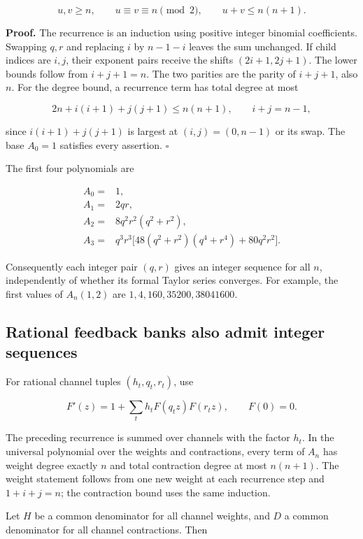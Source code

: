 \[
u,v\ge n,\qquad u\equiv v\equiv n\pmod2,\qquad u+v\le n(n+1).
\]

\textbf{Proof.} The recurrence is an induction using positive integer
binomial coefficients. Swapping \(q,r\) and replacing \(i\) by \(n-1-i\)
leaves the sum unchanged. If child indices are \(i,j\), their exponent
pairs receive the shifts \((2i+1,2j+1)\). The lower bounds follow from
\(i+j+1=n\). The two parities are the parity of \(i+j+1\), also \(n\).
For the degree bound, a recurrence term has total degree at most

\[
2n+i(i+1)+j(j+1)\le n(n+1),\qquad i+j=n-1,
\]

since \(i(i+1)+j(j+1)\) is largest at \((i,j)=(0,n-1)\) or its swap. The
base \(A_0=1\) satisfies every assertion. \(\square\)

The first four polynomials are

\[
\begin{aligned}
A_0={}&1,\\
A_1={}&2qr,\\
A_2={}&8q^2r^2(q^2+r^2),\\
A_3={}&q^3r^3\bigl[48(q^2+r^2)(q^4+r^4)+80q^2r^2\bigr].
\end{aligned}
\]

Consequently each integer pair \((q,r)\) gives an integer sequence for
all \(n\), independently of whether its formal Taylor series converges.
For example, the first values of \(A_n(1,2)\) are
\(1,4,160,35200,38041600\).

\hypertarget{rational-feedback-banks-also-admit-integer-sequences}{%
\subsection{Rational feedback banks also admit integer
sequences}\label{rational-feedback-banks-also-admit-integer-sequences}}

For rational channel tuples \((h_t,q_t,r_t)\), use

\[
F'(z)=1+\sum_t h_tF(q_tz)F(r_tz),\qquad F(0)=0.
\]

The preceding recurrence is summed over channels with the factor
\(h_t\). In the universal polynomial over the weights and contractions,
every term of \(A_n\) has weight degree exactly \(n\) and total
contraction degree at most \(n(n+1)\). The weight statement follows from
one new weight at each recurrence step and \(1+i+j=n\); the contraction
bound uses the same induction.

Let \(H\) be a common denominator for all channel weights, and \(D\) a
common denominator for all channel contractions. Then

